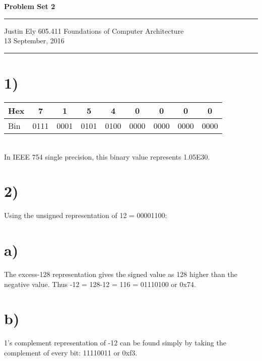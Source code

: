 \documentclass[a4paper,11pt]{article}
\begin{document}
\begin{flushright}

\vspace{1.1cm}

{\bf\Huge Problem Set 2}

\rule{0.25\linewidth}{0.5pt}

\vspace{0.5cm}
Justin Ely
\linebreak
\newline
\footnotesize{605.411 Foundations of Computer Architecture \\}
\vspace{0.5cm}
13 September, 2016
\end{flushright}

\noindent\rule{\linewidth}{1.0pt}


\section*{1)}
\begin{tabular}{| l | c | c | c | c | c | c | c | c |}
  \hline	
  Hex & 7 & 1 & 5 & 4 & 0 & 0 & 0 & 0 \\  \hline  		
  Bin & 0111 & 0001 & 0101 & 0100 & 0000 & 0000 & 0000 & 0000 \\ \hline
\end{tabular} \\

\noindent  In IEEE 754 single precision, this binary value represents 1.05E30.


\section*{2)} 
Using the unsigned representation of 12 = 00001100:

\section*{a)}
The excess-128 representation gives the signed value as 128 higher than the negative value.  Thus -12 = 128-12 = 116 = 01110100 or 0x74.

\section*{b)} 
1's complement representation of -12 can be found simply by taking the complement of every bit: 11110011 or 0xf3.
\end{document}
